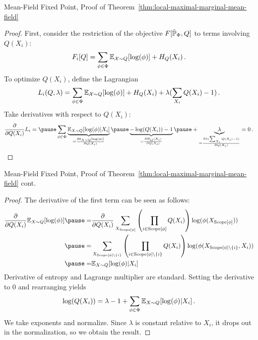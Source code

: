\begin{frame}{Mean-Field Fixed Point, Proof of Theorem~\ref{thm:local-maximal-marginal-mean-field}}
\begin{proof}
First, consider the restriction of the objective $F[\tilde{\Pb}_{\Phi},Q]$ to terms involving $Q(X_i)$:
\begin{equation}
    F_i[Q] 
    = \sum_{\phi \in \Phi} \E_{\mathcal{X} \sim Q}[\log(\phi)] + H_Q(X_i)\,.
\end{equation}
\pause
To optimize $Q(X_i)$, define the Lagrangian
\begin{equation}
    L_i(Q,\lambda) = \sum_{\phi \in \Phi} \E_{\mathcal{X} \sim Q}[\log(\phi)] + H_Q(X_i) + \lambda (\sum_{X_i} Q(X_i) - 1)\,.
\end{equation}
\pause
Take derivatives with respect to $Q(X_i)$:
\begin{equation}
    \frac{\partial}{\partial Q(X_i)} L_i = \pause \sum_{\phi \in \Phi}
    \underbrace{\E_{X \sim Q}[ \log(\phi) | X_i]}_{= \frac{\partial \E_{X \sim Q}[\log(\phi)]}{\partial Q(X_i)}} \pause \underbrace{- \log(Q(X_i)) - 1}_{= \frac{\partial H_Q(X_i)}{\partial Q(X_i)}} \pause + \underbrace{\lambda}_{= \frac{\partial \lambda(\sum_{X_i} Q(X_i) - 1)}{\partial Q(X_i)}} = 0\,.
\end{equation}
\end{proof}
\end{frame}

\begin{frame}{Mean-Field Fixed Point, Proof of Theorem~\ref{thm:local-maximal-marginal-mean-field} cont.}
\begin{proof}
The derivative of the first term can be seen as follows:
\begin{equation}
    \begin{aligned}
    \frac{\partial}{\partial Q(X_i)} \E_{X \sim Q} [\log(\phi)] 
    \pause
    = & \frac{\partial}{\partial Q(X_i)} \sum_{X_{\Scope[\phi]}} \left( \prod_{i \in \Scope[\phi]} Q(X_i) \right) \log(\phi(X_{\Scope[\phi]})) \\
    \pause
    = & \sum_{X_{\Scope[\phi] \backslash \{i\}}} \left( \prod_{i \in \Scope[\phi] \backslash \{i\}} Q(X_i) \right) \log(\phi(X_{\Scope[\phi] \backslash \{i\}}, X_i)) \\
    \pause
    = & \E_{X \sim Q}[ \log(\phi) | X_i]
    \end{aligned}
\end{equation}
\pause
Derivative of entropy and Lagrange multiplier are standard.
\pause
Setting the derivative to $0$ and rearranging yields
\begin{equation}
    \log(Q(X_i)) = \lambda - 1 + \sum_{\phi \in \Phi} \E_{X \sim Q}[ \log(\phi) | X_i] \,.
\end{equation}
\pause
We take exponents and normalize.
\pause Since $\lambda$ is constant relative to $X_i$, it drops out in the normalization, so we obtain the result.
\end{proof}
\end{frame}

